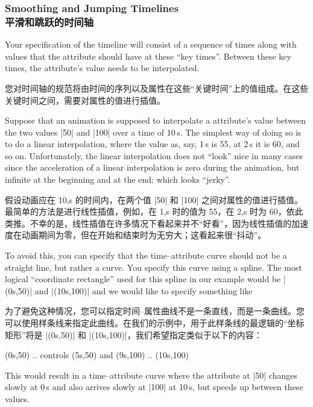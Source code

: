 \subsubsection{Smoothing and Jumping Timelines\\平滑和跳跃的时间轴}
\label{section-anim-smooth}

Your specification of the timeline will consist of a sequence of times along
with values that the attribute should have at these ``key times''. Between
these key times, the attribute's value needs to be interpolated.

您对时间轴的规范将由时间的序列以及属性在这些“关键时间”上的值组成。在这些关键时间之间，需要对属性的值进行插值。

Suppose that an animation is supposed to interpolate a attribute's value
between the two values |50| and |100| over a time of 10\,s. The simplest way of
doing so is to do a linear interpolation, where the value as, say, 1\,s is 55,
at 2\,s it is 60, and so on. Unfortunately, the linear interpolation does not
``look'' nice in many cases since the acceleration of a linear interpolation is
zero  during the animation, but infinite at the beginning and at the end; which
looks ``jerky''.

假设动画应在 10,s 的时间内，在两个值 |50| 和 |100| 之间对属性的值进行插值。最简单的方法是进行线性插值，例如，在 1,s 时的值为 55，在 2,s 时为 60，依此类推。不幸的是，线性插值在许多情况下看起来并不“好看”，因为线性插值的加速度在动画期间为零，但在开始和结束时为无穷大；这看起来很“抖动”。

To avoid this, you can specify that the time--attribute curve should not be a
straight line, but rather a curve. You specify this curve using a spline. The
most logical ``coordinate rectangle'' used for this spline in our example would
be |(0s,50)| and |(10s,100)| and we would like to specify something like

为了避免这种情况，您可以指定时间--属性曲线不是一条直线，而是一条曲线。您可以使用样条线来指定此曲线。在我们的示例中，用于此样条线的最逻辑的“坐标矩形”将是 |(0s,50)| 和 |(10s,100)|，我们希望指定类似于以下的内容：


\begin{codeexample}
  (0s,50) .. controls (5s,50) and (9s,100) .. (10s,100)
\end{codeexample}
%
This would result in a time--attribute curve where the attribute at |50|
changes slowly at 0\,s and also arrives slowly at |100| at 10\,s, but speeds up
between these values.

